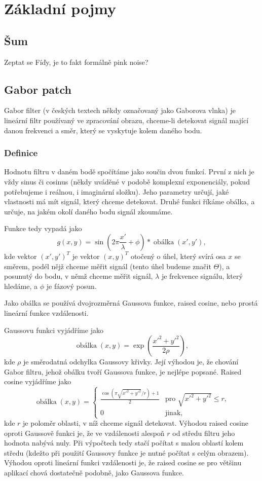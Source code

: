 \chapter{Základní pojmy}

\section{Šum}

Zeptat se Fíďy, je to fakt formálně pink noise?




\section{Gabor patch}

Gabor filter (v českých textech někdy označovaný jako Gaborova vlnka) je
lineární filtr používaný ve zpracování obrazu, chceme-li detekovat signál
mající danou frekvenci a směr, který se vyskytuje kolem daného bodu.

\subsection{Definice}

Hodnotu filtru v daném bodě spočítáme jako součin dvou funkcí. První z nich je
vždy sinus či cosinus (někdy uváděné v podobě komplexní exponenciály, pokud
potřebujeme i reálnou, i imaginární složku). Jeho parametry určují, jaké
vlastnosti má mít signál, který chceme detekovat. Druhé funkci říkáme obálka, a
určuje, na jakém okolí daného bodu signál zkoumáme.

Funkce tedy vypadá jako $$g(x,y) =
\sin\left(2\pi\frac{x'}{\lambda}+\phi\right)*\operatorname{obálka}(x',y'),$$
kde vektor $(x',y')^T$ je vektor $(x,y)^T$ otočený o úhel, který svírá osa $x$
se směrem, podél nějž chceme měřit signál (tento úhel budeme značit $\Theta$),
a posunutý do bodu, v němž chceme měřit signál, $\lambda$ je frekvence signálu,
který hledáme, a $\phi$ je fázový posun.

Jako obálka se používá dvojrozměrná Gaussova funkce, raised cosine, nebo prostá lineární funkce vzdálenosti. 

Gaussovu funkci vyjádříme jako $$ \operatorname{obálka}(x,y) =  \exp\left(\frac{x'^2 +
y'^2}{2\rho}\right),$$ kde $\rho$ je směrodatná odchylka Gaussovy křivky. Její výhodou je, že chování Gabor filtru, jehož obálku tvoří Gaussova funkce, je nejlépe popsané. Raised cosine vyjádříme jako 
$$
\operatorname{obálka}(x,y)=
\begin{cases}
 \frac{\cos(\pi\sqrt{x'^2+y'^2}/r)+1}2 &\text{pro $\sqrt{x'^2+y'^2}\leq r$,}\\[1ex]
 0 &\text{jinak,}
\end{cases}
$$ kde $r$ je poloměr oblasti, v níž chceme signál detekovat. Výhodou raised cosine oproti Gaussově funkci je, že ve vzdálenosti alespoň $r$ od středu filtru jeho hodnota nabývá nuly. Při výpočtech tedy stačí počítat s malou oblastí kolem středu (kdežto při použití Gaussovy funkce je nutné počítat s celým obrazem). Výhodou oproti lineární funkci vzdálenosti je, že raised cosine se pro většinu aplikací chová dostatečně podobně, jako Gaussova funkce.

